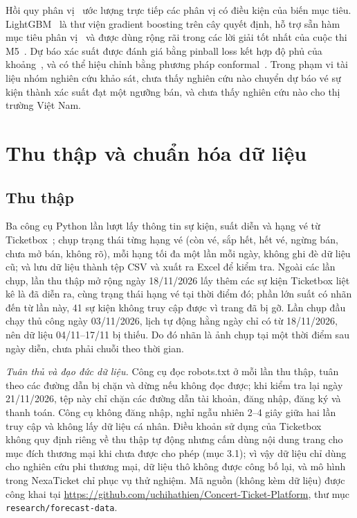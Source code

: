 \documentclass{IEEEtran}
\begin{document}
Hồi quy phân vị~\cite{koenker1978} ước lượng trực tiếp các phân vị có điều kiện của biến mục tiêu. LightGBM~\cite{ke2017} là thư viện gradient boosting trên cây quyết định, hỗ trợ sẵn hàm mục tiêu phân vị~\cite{lgbmdoc} và được dùng rộng rãi trong các lời giải tốt nhất của cuộc thi M5~\cite{makridakis2022}. Dự báo xác suất được đánh giá bằng pinball loss kết hợp độ phủ của khoảng~\cite{gneiting2007}, và có thể hiệu chỉnh bằng phương pháp conformal~\cite{romano2019}. Trong phạm vi tài liệu nhóm nghiên cứu khảo sát, chưa thấy nghiên cứu nào chuyển dự báo vé sự kiện thành xác suất đạt một ngưỡng bán, và chưa thấy nghiên cứu nào cho thị trường Việt Nam.

\section{Thu thập và chuẩn hóa dữ liệu}
\label{sec:data}
\subsection{Thu thập}
Ba công cụ Python lần lượt lấy thông tin sự kiện, suất diễn và hạng vé từ Ticketbox~\cite{ticketbox}; chụp trạng thái từng hạng vé (còn vé, sắp hết, hết vé, ngừng bán, chưa mở bán, không rõ), mỗi hạng tối đa một lần mỗi ngày, không ghi đè dữ liệu cũ; và lưu dữ liệu thành tệp CSV và xuất ra Excel để kiểm tra. Ngoài các lần chụp, lần thu thập mở rộng ngày 18/11/2026 lấy thêm các sự kiện Ticketbox liệt kê là đã diễn ra, cùng trạng thái hạng vé tại thời điểm đó; phần lớn suất có nhãn đến từ lần này, 41 sự kiện không truy cập được vì trang đã bị gỡ. Lần chụp đầu chạy thủ công ngày 03/11/2026, lịch tự động hằng ngày chỉ có từ 18/11/2026, nên dữ liệu 04/11--17/11 bị thiếu. Do đó nhãn là ảnh chụp tại một thời điểm sau ngày diễn, chưa phải chuỗi theo thời gian.

\textit{Tuân thủ và đạo đức dữ liệu.} Công cụ đọc robots.txt ở mỗi lần thu thập, tuân theo các đường dẫn bị chặn và dừng nếu không đọc được; khi kiểm tra lại ngày 21/11/2026, tệp này chỉ chặn các đường dẫn tài khoản, đăng nhập, đăng ký và thanh toán. Công cụ không đăng nhập, nghỉ ngẫu nhiên 2--4 giây giữa hai lần truy cập và không lấy dữ liệu cá nhân. Điều khoản sử dụng của Ticketbox~\cite{ticketboxtos} không quy định riêng về thu thập tự động nhưng cấm dùng nội dung trang cho mục đích thương mại khi chưa được cho phép (mục 3.1); vì vậy dữ liệu chỉ dùng cho nghiên cứu phi thương mại, dữ liệu thô không được công bố lại, và mô hình trong NexaTicket chỉ phục vụ thử nghiệm. Mã nguồn (không kèm dữ liệu) được công khai tại \url{https://github.com/uchihathien/Concert-Ticket-Platform}, thư mục \texttt{research/forecast-data}.
\end{document}
